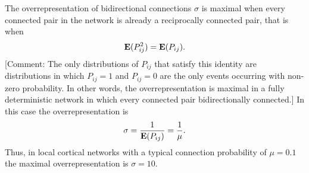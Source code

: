 
The overrepresentation of bidirectional connections $\sigma$ is maximal when every connected pair in the network is already a reciprocally connected pair, that is when
\[
\operatorname{\mathbf{E}}(P_{ij}^2) = \operatorname{\mathbf{E}}(P_{ij}).
\]
[Comment: The only distributions of $P_{ij}$ that satisfy this identity are distributions in which $P_{ij}=1$ and $P_{ij}=0$ are the only events occurring with non-zero probability. In other words, the overrepresentation is maximal in a fully deterministic network in which every connected pair bidirectionally connected.]
%
In this case the overrepresentation is
\[
\sigma = \frac{1}{\operatorname{\mathbf{E}}(P_{ij})} = \frac{1}{\mu}.
\]
Thus, in local cortical networks with a typical connection probability of $\mu = 0.1$ the maximal overrepresentation is $\sigma = 10$.
